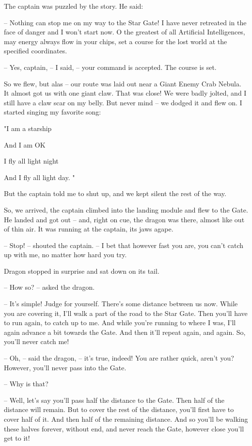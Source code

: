 \documentclass[ebook,twoside,final,openright]{memoir}
\begin{document}
\par
The captain was puzzled by the story. He said:\par
– Nothing can stop me on my way to the Star Gate! I have never retreated in the face of danger and I won’t start now. O the greatest of all Artificial Intelligences, may energy always flow in your chips, set a course for the lost world at the specified coordinates.\par
– Yes, captain, – I said, – your command is accepted. The course is set.\par
So we flew, but alas – our route was laid out near a Giant Enemy Crab Nebula. It almost got us with one giant claw. That was close! We were badly jolted, and I still have a claw scar on my belly. But never mind – we dodged it and flew on. I started singing my favorite song: \par
"I am a starship \par
 And I am OK \par
 I fly all light night \par
 And I fly all light day. "\par
 But the captain told me to shut up, and we kept silent the rest of the way.\par
\par
So, we arrived, the captain climbed into the landing module and flew to the Gate. He landed and got out – and, right on cue, the dragon was there, almost like out of thin air. It was running at the captain, its jaws agape.\par
– Stop! – shouted the captain. – I bet that however fast you are, you can’t catch up with me, no matter how hard you try.\par
Dragon stopped in surprise and sat down on its tail.\par
– How so? – asked the dragon.\par
– It’s simple! Judge for yourself. There’s some distance between us now. While you are covering it, I’ll walk a part of the road to the Star Gate. Then you’ll have to run again, to catch up to me. And while you’re running to where I was, I’ll again advance a bit towards the Gate. And then it’ll repeat again, and again. So, you’ll never catch me!\par
– Oh, – said the dragon, – it’s true, indeed! You are rather quick, aren’t you? However, you’ll never pass into the Gate.\par
– Why is that?\par
– Well, let’s say you’ll pass half the distance to the Gate. Then half of the distance will remain. But to cover the rest of the distance, you’ll first have to cover half of it. And then half of the remaining distance. And so you’ll be walking these halves forever, without end, and never reach the Gate, however close you’ll get to it!\par
\end{document}
